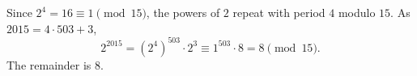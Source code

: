 Since $2^4=16\equiv1\pmod{15}$, the powers of $2$ repeat with period $4$ modulo $15$. As $2015=4\cdot503+3$,
\[
2^{2015}=\left(2^4\right)^{503}\cdot2^3\equiv1^{503}\cdot8=8\pmod{15}.
\]
The remainder is $\boxed{8}$.

